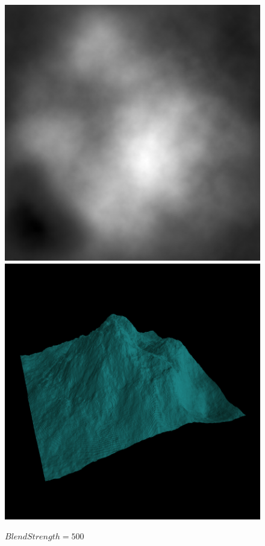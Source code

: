 	\begin{figure}[H]
	  \centering
	  \includegraphics[width=\imagewidth]{images/results/terrains/512-1/blending/bs_500}
	  \includegraphics[width=\imagewidth]{images/results/terrains/512-1/blending/bs_500_3d}
	  \caption{$BlendStrength = 500$}
	  \label{fig:ex-bs500-surface}
	\end{figure}
	
